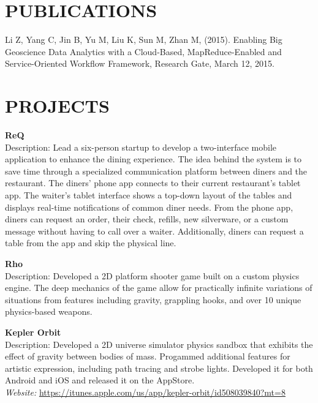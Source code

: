 \documentclass[line,margin]{res}
\begin{document}
\begin{resume}
                 \section{PUBLICATIONS}
                 Li Z, Yang C, Jin B, Yu M, Liu K, Sun M, Zhan M, (2015). Enabling Big Geoscience Data Analytics with a Cloud-Based, MapReduce-Enabled and Service-Oriented Workflow Framework, Research Gate, March 12, 2015.

                 \section{PROJECTS}
                         \textbf {ReQ} \\                 
                         Description: Lead a six-person startup to develop a two-interface mobile application to enhance the dining experience. The idea behind the system is to save time through a specialized communication platform between diners and the restaurant. The diners' phone app connects to their current restaurant's tablet app. The waiter's tablet interface shows a top-down layout of the tables and displays real-time notifications of common diner needs. From the phone app, diners can request an order, their check, refills, new silverware, or a custom message without having to call over a waiter. Additionally, diners can request a table from the app and skip the physical line.

                         \textbf{Rho} \\
                         Description: Developed a 2D platform shooter game built on a custom physics engine. The deep mechanics of the game allow for practically infinite variations of situations from features including gravity, grappling hooks, and over 10 unique physics-based weapons.

                         \textbf{Kepler Orbit} \\
                         Description: Developed a 2D universe simulator physics sandbox that exhibits the effect of gravity between bodies of mass. Progammed additional features for artistic expression, including path tracing and strobe lights. Developed it for both Android and iOS and released it on the AppStore. \\
                         \textit{Website: } \url{https://itunes.apple.com/us/app/kepler-orbit/id508039840?mt=8}
                         

\end{resume}
\end{document}
